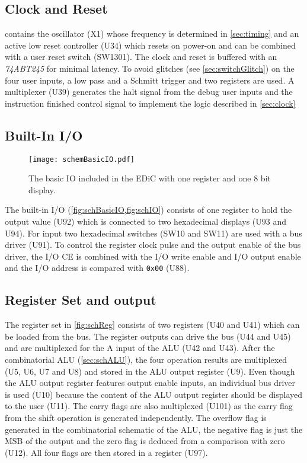 \subsection{Clock and Reset}\label{sec:schClock}
 contains the oscillator (X1) whose frequency is determined in \cref{sec:timing} and an active low reset controller (U34) which resets on power-on and can be combined with a user reset switch (SW1301).
The clock and reset is buffered with an \emph{74ABT245} for minimal latency.
To avoid glitches (see \cref{sec:switchGlitch}) on the four user inputs, a low pass and a Schmitt trigger and two registers are used.
A multiplexer (U39) generates the halt signal from the debug user inputs and the instruction finished control signal to implement the logic described in \cref{sec:clock}

\subsection{Built-In I/O}
\begin{figure}[t]
  \centering
  \texttt{[image: schemBasicIO.pdf]}
  \caption{The basic \gls{IO} included in the \gls{EDiC} with one register and one 8 bit display.}
  \label{fig:schBasicIO}
\end{figure}
The built-in I/O (\cref{fig:schBasicIO,fig:schIO}) consists of one register to hold the output value (U92) which is connected to two hexadecimal displays (U93 and U94).
For input two hexadecimal switches (SW10 and SW11) are used with a bus driver (U91).
To control the register clock pulse and the output enable of the bus driver, the I/O \gls{CE} is combined with the I/O write enable and I/O output enable and the I/O address is compared with \texttt{0x00} (U88).

\subsection{Register Set and  output}
The register set in \cref{fig:schReg} consists of two registers (U40 and U41) which can be loaded from the bus.
The register outputs can drive the bus (U44 and U45) and are multiplexed for the A input of the \gls{ALU} (U42 and U43).
After the combinatorial \gls{ALU} (\cref{sec:schALU}), the four operation results are multiplexed (U5, U6, U7 and U8) and stored in the \gls{ALU} output register (U9).
Even though the \gls{ALU} output register features output enable inputs, an individual bus driver is used (U10) because the content of the \gls{ALU} output register should be displayed to the user (U11).
The carry flags are also multiplexed (U101) as the carry flag from the shift operation is generated independently.
The overflow flag is generated in the combinatorial schematic of the \gls{ALU}, the negative flag is just the \gls{MSB} of the output and the zero flag is deduced from a comparison with zero (U12).
All four flags are then stored in a register (U97).
